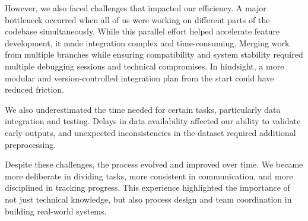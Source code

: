 However, we also faced challenges that impacted our efficiency. A major bottleneck occurred when all of us were working on different parts of the codebase simultaneously. While this parallel effort helped accelerate feature development, it made integration complex and time-consuming. Merging work from multiple branches while ensuring compatibility and system stability required multiple debugging sessions and technical compromises. In hindsight, a more modular and version-controlled integration plan from the start could have reduced friction.

We also underestimated the time needed for certain tasks, particularly data integration and testing. Delays in data availability affected our ability to validate early outputs, and unexpected inconsistencies in the dataset required additional preprocessing.

Despite these challenges, the process evolved and improved over time. We became more deliberate in dividing tasks, more consistent in communication, and more disciplined in tracking progress. This experience highlighted the importance of not just technical knowledge, but also process design and team coordination in building real-world systems.



